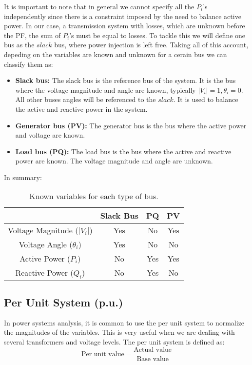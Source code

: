 \documentclass[a4paper,11pt, titlepage, twoside]{article}
\begin{document}
It is important to note that in general we cannot specify all the $P_i$'s independently since there is a constraint imposed by the need to balance active power. In our case, a transmission system with losses, which are unknown before the PF,
the sum of $P_i$'s must be equal to losses. To tackle this we will define one bus as the $slack$ bus, where power injection is left free. Taking all of this account, depeding on the variables are known and unknown for a cerain bus we can classify them as:
\begin{itemize}
    \item \textbf{Slack bus:} The slack bus is the reference bus of the system. It is the bus where the voltage magnitude and angle are known, typically $|V_i|= 1, \theta_i= 0 $.
    All other buses angles will be referenced to the $slack$. It is used to balance the active and reactive power in the system.
    \item \textbf{Generator bus (PV):} The generator bus is the bus where the active power and voltage are known.
    \item \textbf{Load bus (PQ):} The load bus is the bus where the active and reactive power are known. The voltage magnitude and angle are unknown.
\end{itemize}
In summary:
\begin{table}[h]
    \centering
    \begin{tabular}{|c|c|c|c|}
        \hline
        & Slack Bus & PQ & PV \\
        \hline
        Voltage Magnitude ($|V_i|$) & Yes & No & Yes \\
        \hline
        Voltage Angle ($\theta_i$) & Yes & No & No \\
        \hline
        Active Power ($P_i$) & No & Yes & Yes \\
        \hline
        Reactive Power ($Q_i$) & No & Yes & No \\
        \hline
    \end{tabular}
    \caption{Known variables for each type of bus.}
    \label{tab:bus_variables}
\end{table}





\subsection{Per Unit System (p.u.)}

In power systems analysis, it is common to use the per unit system to normalize the magnitudes of the variables. This is very useful when we are dealing with several transformers and voltage levels. 
The per unit system is defined as:
\begin{equation}
    \text{Per unit value} = \frac{\text{Actual value}}{\text{Base value}}
\end{equation}
\end{document}
